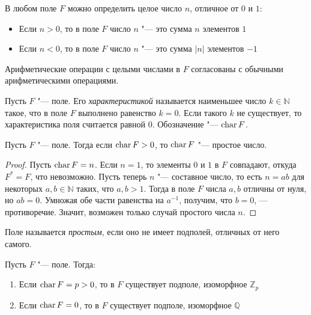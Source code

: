 \begin{note}
	В любом поле $F$ можно определить целое число $n$, отличное от $0$ и $1$:
	\begin{itemize}
		\item Если $n > 0$, то в поле $F$ число $n$ "--- это сумма $n$ элементов $1$
		\item Если $n < 0$, то в поле $F$ число $n$ "--- это сумма $|n|$ элементов $-1$
	\end{itemize}
	
	Арифметические операции с целыми числами в $F$ согласованы с обычными арифметическими операциями.
\end{note}

\begin{definition}
	Пусть $F$ "--- поле. Его \textit{характеристикой} называется наименьшее число $k \in \mathbb{N}$ такое, что в поле $F$ выполнено равенство $k = 0$. Если такого $k$ не существует, то характеристика поля считается равной $0$. Обозначение "--- $\operatorname{char}{F}$.
\end{definition}

\begin{proposition}
	Пусть $F$ "--- поле. Тогда если $\operatorname{char}{F} > 0$, то $\operatorname{char}{F}$ "--- простое число.
\end{proposition}

\begin{proof}
	Пусть $\operatorname{char}{F} = n$. Если $n = 1$, то элементы $0$ и $1$ в $F$ совпадают, откуда $F^* = F$, что невозможно. Пусть теперь $n$ "--- составное число, то есть $n = ab$ для некоторых $a, b \in \mathbb{N}$ таких, что $a, b > 1$. Тогда в поле $F$ числа $a, b$ отличны от нуля, но $ab = 0$. Умножая обе части равенства на $a^{-1}$, получим, что $b = 0$, --- противоречие. Значит, возможен только случай простого числа $n$.
\end{proof}

\begin{definition}
	Поле называется \textit{простым}, если оно не имеет подполей, отличных от него самого.
\end{definition}

\begin{theorem}
	Пусть $F$ "--- поле. Тогда:
	\begin{enumerate}
		\item Если $\operatorname{char}{F} = p > 0$, то в $F$ существует подполе, изоморфное $\mathbb{Z}_p$
		\item Если $\operatorname{char}{F} = 0$, то в $F$ существует подполе, изоморфное $\mathbb{Q}$
	\end{enumerate}
\end{theorem}

